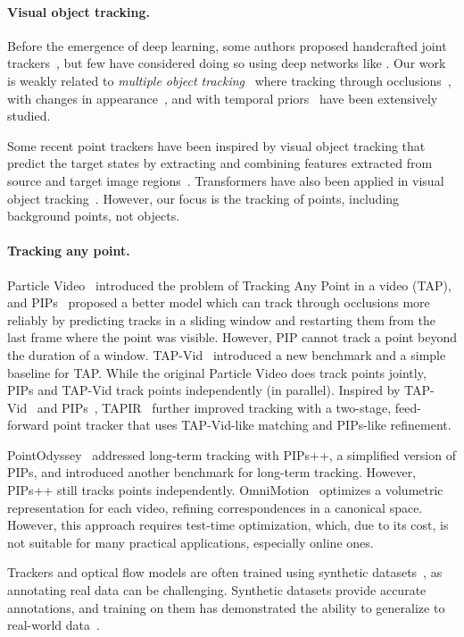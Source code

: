 \paragraph{Visual object tracking.}

Before the emergence of deep learning, some authors proposed handcrafted joint trackers~\cite{birchfield08joint,sand2008particle}, but few have considered doing so using deep networks like \method.
Our work is weakly related to \emph{multiple object tracking}~\cite{chen22visual} where tracking through occlusions~\cite{zhao2004tracking}, with changes in appearance~\cite{matthews2004template}, and with temporal priors~\cite{sidenbladh2000stochastic} have been extensively studied.

Some recent point trackers have been inspired by visual object tracking that predict the target states by extracting and combining features extracted from source and target image regions~\cite{bertinetto2016fully, danelljan2017eco, li2018learning, Bhat_2019_ICCV, danelljan2019atom}.
Transformers have also been applied in visual object tracking~\cite{Chen_2021_CVPR, cui2022mixformer}.
However, our focus is the tracking of points, including background points, not objects.

\paragraph{Tracking any point.}

Particle Video~\cite{sand2008particle} introduced the problem of Tracking Any Point in a video (TAP), and PIPs~\cite{pips} proposed a better model which can track through occlusions more reliably by predicting tracks in a sliding window and restarting them from the last frame where the point was visible.
However, PIP cannot track a point beyond the duration of a window.
TAP-Vid~\cite{tapvid} introduced a new benchmark and a simple baseline for TAP\@.
While the original Particle Video does track points jointly, PIPs and TAP-Vid track points independently (in parallel).
Inspired by TAP-Vid~\cite{tapvid} and PIPs~\cite{pips}, TAPIR~\cite{doersch2023tapir} further improved tracking with a two-stage, feed-forward point tracker that uses TAP-Vid-like matching and PIPs-like refinement.

PointOdyssey~\cite{zheng2023pointodyssey} addressed long-term tracking with PIPs++, a simplified version of PIPs, and introduced another benchmark for long-term tracking.
However, PIPs++ still tracks points independently.
OmniMotion~\cite{wang2023tracking} optimizes a volumetric representation for each video, refining correspondences in a canonical space.
However, this approach requires test-time optimization, which, due to its cost, is not suitable for many practical applications, especially online ones.

Trackers and optical flow models are often trained using synthetic datasets~\cite{karaev2023dynamicstereo, mayer2016large, dosovitskiy2015flownet, sun2021autoflow, butler2012naturalistic, zheng2023pointodyssey}, as annotating real data can be challenging.
Synthetic datasets provide accurate annotations, and training on them has demonstrated the ability to generalize to real-world data~\cite{mayer2016large, sun2021autoflow}.


